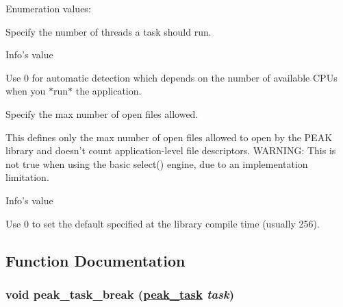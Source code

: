 \begin{Desc}
\item[Enumeration values: ]\par
\begin{description}
\item[{\em 
\hypertarget{group__task__common_gga10a2}{
PEAK\_\-TASK\_\-FLAVOR\_\-NTHREADS}
\label{group__task__common_gga10a2}
}]Specify the number of threads a task should run. 

\begin{Desc}
\item[Info's value]\end{Desc}
Use 0 for automatic detection which depends on the number of available CPUs when you $\ast$run$\ast$ the application. \item[{\em 
\hypertarget{group__task__common_gga10a3}{
PEAK\_\-TASK\_\-FLAVOR\_\-MAXFDS}
\label{group__task__common_gga10a3}
}]Specify the max number of open files allowed. 

This defines only the max number of open files allowed to open by the PEAK library and doesn't count application-level file descriptors. WARNING: This is not true when using the basic select() engine, due to an implementation limitation.

\begin{Desc}
\item[Info's value]\end{Desc}
Use 0 to set the default specified at the library compile time (usually 256). \end{description}
\end{Desc}



\subsection{Function Documentation}
\hypertarget{group__task__common_ga9}{
\subsubsection[peak\_\-task\_\-break]{\setlength{\rightskip}{0pt plus 5cm}void peak\_\-task\_\-break (\hyperlink{group__task__common_ga0}{peak\_\-task} {\em task})}}
\label{group__task__common_ga9}


